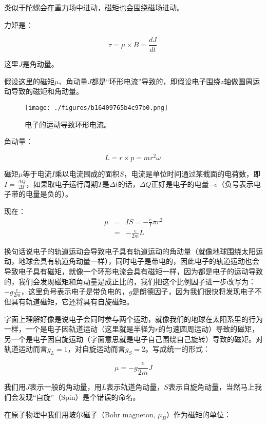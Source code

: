 类似于陀螺会在重力场中进动，磁矩也会围绕磁场进动。

力矩是：

\begin{equation}
\tau = \mu \times B = \frac{d J}{d t}~
\end{equation}

这里$J$是角动量。

假设这里的磁矩$\mu $、角动量$J $都是“环形电流”导致的，即假设电子围绕$z$轴做圆周运动导致的磁矩和角动量。

\begin{figure}[ht]
\centering
\texttt{[image: ./figures/b16409765b4c97b0.png]}
\caption{电⼦的运动导致环形电流。} \label{fig_QMPre2_14}
\end{figure}

角动量：

\begin{equation}
L = r \times p =  m r^2 \omega ~
\end{equation}

磁矩$\mu$等于电流$I$乘以电流围成的面积$S$，电流是单位时间通过某截面的电荷数，即$I = \frac{\Delta Q}{\Delta t}$，如果取电子运行周期$T$是$\Delta t $的话，$\Delta Q$正好是电子的电量$- e$（负号表示电子带的电量是负的）。

现在：
\begin{eqnarray*}
\mu & = & IS = - \frac{e }{T } \pi r^2 \\
{} &=& - \frac{e}{2m} L
\end{eqnarray*}

换句话说电子的轨道运动会导致电子具有轨道运动的角动量（就像地球围绕太阳运动，地球会具有轨道角动量一样），同时电子是带电的，因此电子的轨道运动也会导致电子具有磁矩，就像一个环形电流会具有磁矩一样，因为都是电子的运动导致的，我们会发现磁矩和角动量是成正比的，我们把这个比例因子进一步改写为：$- g \frac{e}{2m}$，这里负号表示电子是带负电的，$g$是朗德因子，因为我们很快将发现电子不但具有轨道磁矩，它还将具有自旋磁矩。

字面上理解好像是说电子会同时参与两个运动，就像我们的地球在太阳系里的行为一样，一个是电子因轨道运动（这里就是半径为$r$的匀速圆周运动）导致的磁矩，另一个是电子因自旋运动（字面意思就是电子自己围绕自己旋转）导致的磁矩。对轨道运动而言$g_L = 1$，对自旋运动而言$g_S = 2$。写成统一的形式：

\begin{equation}
\mu = - g \frac{e}{2m} J
\end{equation}

我们用$J$表示一般的角动量，用$L$表示轨道角动量，$S$表示自旋角动量，当然马上我们会发现“自旋”（Spin）是个错误的命名。

在原子物理中我们用玻尔磁子（Bohr magneton, $\mu_B$）作为磁矩的单位：
